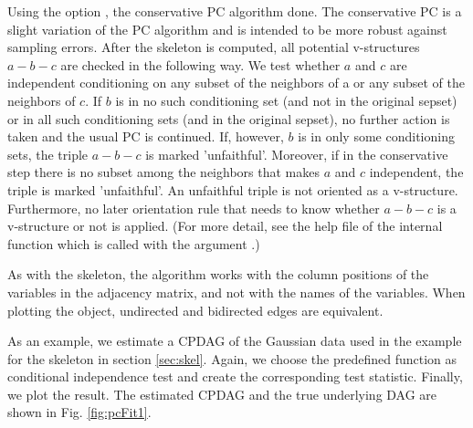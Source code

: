 \documentclass[article]{jss}
\begin{document}
Using the option , the conservative PC
algorithm done. The conservative PC is a slight variation of the PC
algorithm and is intended to be more robust against sampling errors. After
the skeleton is computed, all potential v-structures $a-b-c$ are checked in
the following way. We test whether $a$ and $c$ are independent conditioning
on any subset of the neighbors of a or any subset of the neighbors of
$c$. If $b$ is in no such conditioning set (and not in the original sepset)
or in all such conditioning sets (and in the original sepset), no further
action is taken and the usual PC is continued. If, however, $b$ is in only
some conditioning sets, the triple $a-b-c$ is marked
'unfaithful'. Moreover, if in the conservative step there is no subset
among the neighbors that makes $a$ and $c$ independent, the triple is
marked 'unfaithful'. An unfaithful triple is not oriented as a v-structure.
Furthermore, no later orientation rule that needs to know whether $a-b-c$
is a v-structure or not is applied. (For more detail, see the help file of
the internal function  which is called with the argument
.)  

As with the skeleton, the algorithm works with the column positions of the
variables in the adjacency matrix, and not with the names of the
variables. When plotting the object, undirected and bidirected edges are
equivalent.

As an example, we estimate a CPDAG of the Gaussian data used in the
example for the skeleton in section \ref{sec:skel}. Again, we choose
the predefined function  as conditional independence
test and create the corresponding test statistic. Finally, we plot the
result. The estimated CPDAG and the true underlying DAG are shown in
Fig. \ref{fig:pcFit1}.
\end{document}
